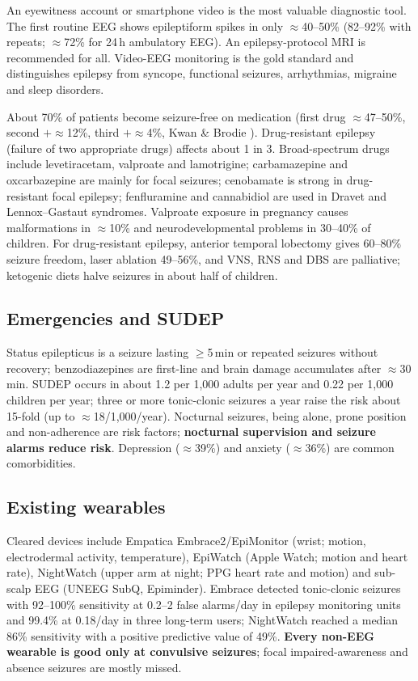 An eyewitness account or smartphone video is the most valuable diagnostic tool. The first routine EEG shows epileptiform spikes in only $\approx$40--50\% (82--92\% with repeats; $\approx$72\% for 24\,h ambulatory EEG). An epilepsy-protocol MRI is recommended for all. Video-EEG monitoring is the gold standard and distinguishes epilepsy from syncope, functional seizures, arrhythmias, migraine and sleep disorders.

About 70\% of patients become seizure-free on medication (first drug $\approx$47--50\%, second $+\approx$12\%, third $+\approx$4\%, Kwan \& Brodie \cite{kwan2000}). Drug-resistant epilepsy (failure of two appropriate drugs) affects about 1 in 3. Broad-spectrum drugs include levetiracetam, valproate and lamotrigine; carbamazepine and oxcarbazepine are mainly for focal seizures; cenobamate is strong in drug-resistant focal epilepsy; fenfluramine and cannabidiol are used in Dravet and Lennox--Gastaut syndromes. Valproate exposure in pregnancy causes malformations in $\approx$10\% and neurodevelopmental problems in 30--40\% of children. For drug-resistant epilepsy, anterior temporal lobectomy gives 60--80\% seizure freedom, laser ablation 49--56\%, and VNS, RNS and DBS are palliative; ketogenic diets halve seizures in about half of children.

\subsection{Emergencies and SUDEP}

Status epilepticus is a seizure lasting $\ge$5\,min or repeated seizures without recovery; benzodiazepines are first-line and brain damage accumulates after $\approx$30\,min. SUDEP \cite{sudep,ryvlin2013} occurs in about 1.2 per 1,000 adults per year and 0.22 per 1,000 children per year; three or more tonic-clonic seizures a year raise the risk about 15-fold (up to $\approx$18/1,000/year). Nocturnal seizures, being alone, prone position and non-adherence are risk factors; \textbf{nocturnal supervision and seizure alarms reduce risk}. Depression ($\approx$39\%) and anxiety ($\approx$36\%) are common comorbidities.

\subsection{Existing wearables}

Cleared devices include Empatica Embrace2/EpiMonitor (wrist; motion, electrodermal activity, temperature), EpiWatch (Apple Watch; motion and heart rate), NightWatch (upper arm at night; PPG heart rate and motion) and sub-scalp EEG (UNEEG SubQ, Epiminder). Embrace \cite{onorati2017} detected tonic-clonic seizures with 92--100\% sensitivity at 0.2--2 false alarms/day in epilepsy monitoring units and 99.4\% at 0.18/day in three long-term users; NightWatch \cite{arends2018} reached a median 86\% sensitivity with a positive predictive value of 49\%. \textbf{Every non-EEG wearable is good only at convulsive seizures}; focal impaired-awareness and absence seizures are mostly missed.

